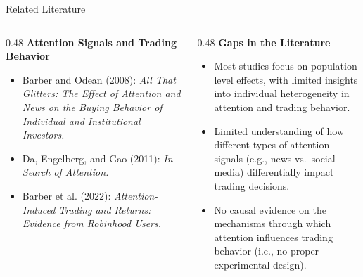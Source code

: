 \documentclass[aspectratio=169, 10pt]{beamer}
\begin{document}
\begin{frame}{Related Literature}
  \begin{columns}[T]
    \begin{column}{0.48\textwidth}
      \textbf{Attention Signals and Trading Behavior}
      \vspace{0.5em}
      \begin{itemize}
        \setlength\itemsep{0.5em}
        \item Barber and Odean (2008): \textit{All That Glitters: The Effect of Attention and News on the Buying Behavior of Individual and Institutional Investors.}
        \item Da, Engelberg, and Gao (2011): \textit{In Search of Attention.}
        \item Barber et al. (2022): \textit{Attention-Induced Trading and Returns: Evidence from Robinhood Users.}
      \end{itemize}
    \end{column}
    \begin{column}{0.48\textwidth}
      \textbf{Gaps in the Literature}
      \vspace{0.5em}
      \begin{itemize}
        \setlength\itemsep{0.5em}
        \item Most studies focus on population level effects, with limited insights into individual heterogeneity in attention and trading behavior.
        \item Limited understanding of how different types of attention signals (e.g., news vs.\ social media) differentially impact trading decisions.
        \item No causal evidence on the mechanisms through which attention influences trading behavior (i.e., no proper experimental design).
      \end{itemize}
    \end{column}
  \end{columns}
\end{frame}
\end{document}
